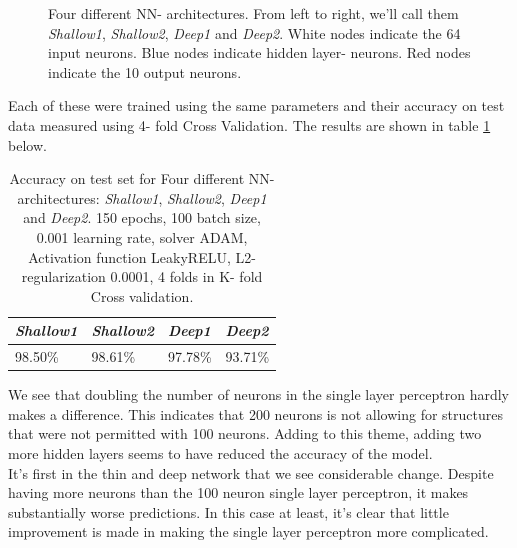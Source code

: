 \documentclass[11pt,a4paper,titlepage]{article}
\def\layersep{2.5cm}
\def\layersepSmall{1.2cm}
\begin{document}
\begin{figure}[H]
\caption[NN architectures]{Four different NN- architectures. From left to right, we'll call them \textit{Shallow1}, \textit{Shallow2}, \textit{Deep1} and \textit{Deep2}. White nodes indicate the 64 input neurons. Blue nodes indicate hidden layer- neurons. Red nodes indicate the 10 output neurons.}
\label{NNarchitectures}
\end{figure}
Each of these were trained using the same parameters and their accuracy on test data measured using 4- fold Cross Validation. The results are shown in table \ref{TinyTableArchitect} below.

\begin{table}[H]
\centering
\caption[NN architectures Accuracy]{Accuracy on test set for Four different NN- architectures: \textit{Shallow1}, \textit{Shallow2}, \textit{Deep1} and \textit{Deep2}. 150 epochs, 100 batch size, 0.001 learning rate, solver ADAM, Activation function LeakyRELU, L2- regularization 0.0001, 4 folds in K- fold Cross validation.}
\begin{tabular}{|l|l|l|l|}
\hline
\textit{Shallow1} & \textit{Shallow2} & \textit{Deep1} & \textit{Deep2} \\ \hline
98.50\%                            & 98.61\%                             & 97.78\%                         & 93.71\%                         \\ \hline
\end{tabular}
\label{TinyTableArchitect}
\end{table}

We see that doubling the number of neurons in the single layer perceptron hardly makes a difference. This indicates that 200 neurons is not allowing for structures that were not permitted with 100 neurons. Adding to this theme, adding two more hidden layers seems to have reduced the accuracy of the model.\\It's first in the thin and deep network that we see considerable change. Despite having more neurons than the 100 neuron single layer perceptron, it makes substantially worse predictions. In this case at least, it's clear that little improvement is made in making the single layer perceptron more complicated.
\end{document}
